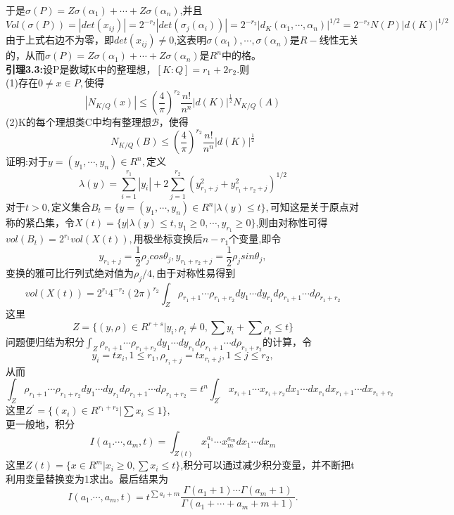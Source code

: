 \documentclass[UTF8]{article}
\begin{document}
    于是$\sigma(P)=Z\sigma(\alpha_{1})+\cdots+Z\sigma(\alpha_{n})$,并且$$
    Vol(\sigma(P))=|det(x_{ij})|=2^{-r_{2}}|det(\sigma_{j}(\alpha_{i}))|=2^{-r_{2}}|d_{K}(\alpha_{1},\cdots,\alpha_{n})|^{1/2}=2^{-r_{2}}N(P)|d(K)|^{1/2}
    $$
    由于上式右边不为零，即$det(x_{ij})\neq 0$,这表明$\sigma(\alpha_{1}),\cdots,\sigma(\alpha_{n})$是$R-$线性无关的，从而$\sigma(P)=Z\sigma(\alpha_{1})+\cdots+Z\sigma(\alpha_{n})$是$R^{n}$中的格。\\
    \textbf{引理3.3:}设P是数域K中的整理想，$[K:Q]=r_{1}+2r_{2}.$则\\
    (1)存在$0\neq x \in P,$使得$$
    |N_{K/Q}(x)|\leq (\frac{4}{\pi})^{r_{2}}\frac{n!}{n^{n}}|d(K)|^{\frac{1}{2}}N_{K/Q}(A)
    $$
    (2)K的每个理想类C中均有整理想$\mathcal{B}，$使得$$
    N_{K/Q}(B)\leq (\frac{4}{\pi})^{r_{2}}\frac{n!}{n^{n}}|d(K)|^{\frac{1}{2}}
    $$
    证明:对于$y=(y_{1},\cdots ,y_{n})\in R^{n},$定义$$
\lambda(y)=\sum_{i=1}^{r_{1}}|y_{i}|+2\sum_{j=1}^{r_{2}}(y_{r_{1}+j}^2+y_{r_{1}+r_{2}+j}^2)^{1/2}
    $$
    对于$t>0,$定义集合$B_{t}=\{y=(y_{1},\cdots ,y_{n})\in R^{n}|\lambda(y)\leq t\},$可知这是关于原点对称的紧凸集，令$X(t)=\{y|\lambda(y)\leq t,y_{1}\geq 0,\cdots,y_{r_{1}}\geq 0\}$,则由对称性可得$vol(B_{t})=2^{r_{1}}vol(X(t)),$用极坐标变换后$n-r_{1}$个变量,即令$$
    y_{r_{1}+j}=\frac{1}{2}\rho_{j}cos\theta_{j}, y_{r_{1}+r_{2}+j}=\frac{1}{2}\rho_{j}sin\theta_{j},
    $$
    变换的雅可比行列式绝对值为$\rho_{j}/4,$由于对称性易得到$$
    vol(X(t))=2^{r_{1}}4^{-r_{2}}(2\pi)^{r_{2}}\int_{Z}\rho_{r_{1}+1}\cdots\rho_{r_{1}+r_{2}}dy_{1}\cdots dy_{r_{1}}d\rho_{r_{1}+1}\cdots d\rho_{r_{1}+r_{2}}  $$
    这里$$Z=\{(y,\rho)\in R^{r+s}|y_{i},\rho_{i}\neq 0,\sum y_{i}+\sum \rho_{i}\leq t \}$$ 
    问题便归结为积分$\int_{Z}\rho_{r_{1}+1}\cdots\rho_{r_{1}+r_{2}}dy_{1}\cdots dy_{r_{1}}d\rho_{r_{1}+1}\cdots d\rho_{r_{1}+r_{2}} $的计算，令$$y_{i}=tx_{i},1\leq r_{1},\rho_{r_{i}+j}=tx_{r_{i}+j},1\leq j\leq r_{2},$$
    从而$$
    \int_{Z}\rho_{r_{1}+1}\cdots\rho_{r_{1}+r_{2}}dy_{1}\cdots dy_{r_{1}}d\rho_{r_{1}+1}\cdots d\rho_{r_{1}+r_{2}}=t^{n}\int_{Z^{'}}x_{r_{i}+1}\cdots x_{r_{i}+r_{2}}dx_{1}\cdots dx_{r_{1}}dx_{r_{1}+1}\cdots dx_{r_{1}+r_{2}}
    $$
    这里$Z^{'}=\{(x_{i})\in R^{r_{1}+r_{2}}|\sum x_{i}\leq 1\},$\\
    更一般地，积分$$
    I(a_{1}.\cdots,a_{m},t)=\int_{Z(t)}x_{1}^{a_{1}}\cdots x_{m}^{a_{m}}dx_{1}\cdots dx_{m}
    $$这里$Z(t)=\{x\in R^{m}|x_{i}\geq 0,\sum x_{i}\leq t\}$,积分可以通过减少积分变量，并不断把t利用变量替换变为1求出。最后结果为$$
     I(a_{1}.\cdots,a_{m},t)=t^{\sum a_{i}+m}\frac{\Gamma(a_{1}+1)\cdots \Gamma(a_{m}+1)}{\Gamma(a_{1}+\cdots +a_{m}+m+1)}.
    $$
\end{document}
